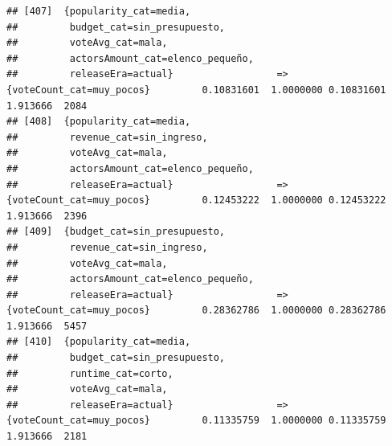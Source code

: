 \documentclass[
]{article}
\begin{document}
\begin{verbatim}
## [407]  {popularity_cat=media,                                                                                                   
##         budget_cat=sin_presupuesto,                                                                                             
##         voteAvg_cat=mala,                                                                                                       
##         actorsAmount_cat=elenco_pequeño,                                                                                        
##         releaseEra=actual}                  => {voteCount_cat=muy_pocos}         0.10831601  1.0000000 0.10831601 1.913666  2084
## [408]  {popularity_cat=media,                                                                                                   
##         revenue_cat=sin_ingreso,                                                                                                
##         voteAvg_cat=mala,                                                                                                       
##         actorsAmount_cat=elenco_pequeño,                                                                                        
##         releaseEra=actual}                  => {voteCount_cat=muy_pocos}         0.12453222  1.0000000 0.12453222 1.913666  2396
## [409]  {budget_cat=sin_presupuesto,                                                                                             
##         revenue_cat=sin_ingreso,                                                                                                
##         voteAvg_cat=mala,                                                                                                       
##         actorsAmount_cat=elenco_pequeño,                                                                                        
##         releaseEra=actual}                  => {voteCount_cat=muy_pocos}         0.28362786  1.0000000 0.28362786 1.913666  5457
## [410]  {popularity_cat=media,                                                                                                   
##         budget_cat=sin_presupuesto,                                                                                             
##         runtime_cat=corto,                                                                                                      
##         voteAvg_cat=mala,                                                                                                       
##         releaseEra=actual}                  => {voteCount_cat=muy_pocos}         0.11335759  1.0000000 0.11335759 1.913666  2181

\end{verbatim}
\end{document}
